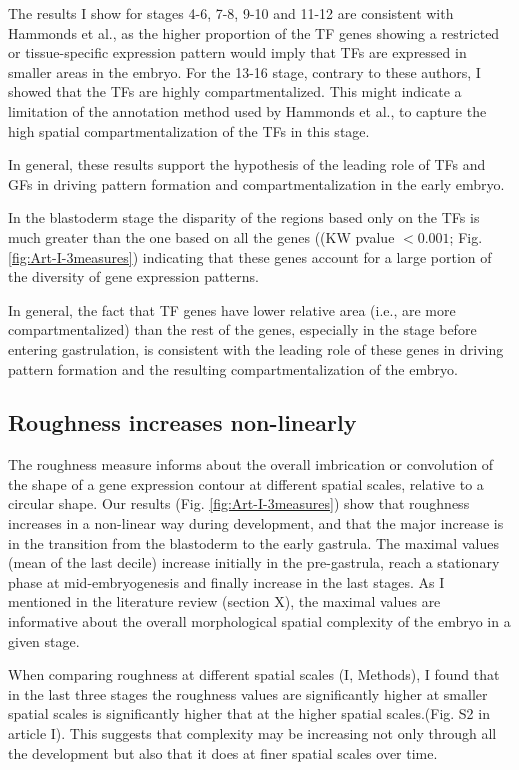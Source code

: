 The results I show for stages 4-6, 7-8, 9-10 and 11-12 are consistent with Hammonds et al., as the higher proportion of the TF genes showing a restricted or tissue-specific expression pattern would imply that TFs are expressed in smaller areas in the embryo. For the 13-16 stage, contrary to these authors, I showed that the TFs are highly compartmentalized. This might indicate a limitation of the annotation method used by Hammonds et al., to capture the high spatial compartmentalization of the TFs in this stage.

In general, these results support the hypothesis of the leading role of TFs and GFs in driving pattern formation and compartmentalization in the early embryo.

In the blastoderm stage the disparity of the regions based only on the TFs is much greater than the one based on all the genes ((KW pvalue $<0.001$; Fig. \ref{fig:Art-I-3measures}) indicating that these genes account for a large portion of the diversity of gene expression patterns.

In general, the fact that TF genes have lower relative area (i.e., are more compartmentalized) than the rest of the genes, especially in the stage before entering gastrulation, is consistent with the leading role of these genes in driving pattern formation and the resulting compartmentalization of the embryo.

\subsection{Roughness increases non-linearly}
The roughness measure informs about the overall imbrication or convolution of the shape of a gene expression contour at different spatial scales, relative to a circular shape.
Our results (Fig. \ref{fig:Art-I-3measures}) show that roughness increases in a non-linear way during development, and that the major increase is in the transition from the blastoderm to the early gastrula.
The maximal values (mean of the last decile) increase initially in the pre-gastrula, reach a stationary phase at mid-embryogenesis and finally increase in the last stages. 
As I mentioned in the literature review (section X), the maximal values are informative about the overall morphological spatial complexity of the embryo in a given stage.

When comparing roughness at different spatial scales (I, Methods), I found that in the last three stages the roughness values are significantly higher at smaller spatial scales is significantly higher that at the higher spatial scales.(Fig. S2 in article I). 
This suggests that complexity may be increasing not only through all the development but also that it does at finer spatial scales over time.


